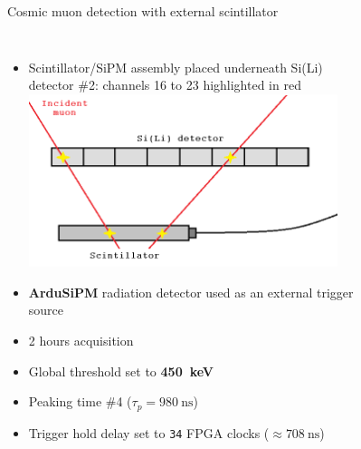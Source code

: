 \documentclass[aspectratio=169,xcolor=dvipsnames,handout]{beamer} %
\begin{document}
\begin{frame}{Cosmic muon detection with external scintillator}
    \addtolength{\leftmargini}{\labelsep}
    \fontsize{9pt}{1}\selectfont
    \begin{columns}
        \begin{itemize}
            \item Scintillator/SiPM assembly placed underneath Si(Li) detector \#2: channels 16 to 23 highlighted in red
            \vskip0.4cm
            \includegraphics[width=0.9\textwidth]{images/muon_detection/scintillator_sensor_detail.png}
            \vskip0.4cm
            \item \textbf{ArduSiPM} radiation detector used as an external trigger source
            \item 2 hours acquisition
            \item Global threshold set to \textbf{\SI{450}{\kilo\electronvolt}}
            \item Peaking time \#4 ($\tau_{p} = \SI{980}{\nano\second}$)
            \item Trigger hold delay set to \texttt{34} FPGA clocks ($\approx \SI{708}{\nano\second}$)
        \end{itemize}
            \vskip-0.2cm
            \begin{figure}[h!]
                \centering
                \begin{tabular}{c c}

\end{tabular}
\end{figure}
\end{columns}
\end{frame}
\end{document}
